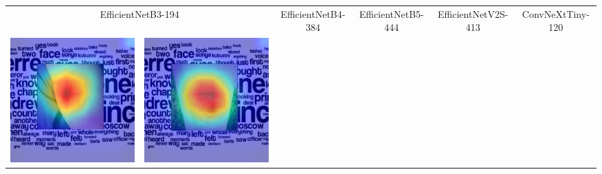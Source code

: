 \begin{landscape}
\begin{table}[]
\begin{tabular}{@{}c c c c c c c c c c@{}}
			\multicolumn{2}{c}{EfficientNetB3-194} & \multicolumn{2}{c}{EfficientNetB4-384} & \multicolumn{2}{c}{EfficientNetB5-444} & \multicolumn{2}{c}{EfficientNetV2S-413} & \multicolumn{2}{c}{ConvNeXtTiny-120}\\
			\includegraphics[width=.12\textheight ,keepaspectratio]{images/pretraining/gradcam/3/EfficientNetB3CombinedGradCam.png} &
			\includegraphics[width=.12\textheight ,keepaspectratio]{images/pretraining/gradcam/9/EfficientNetB3CombinedGradCam.png} &

\end{tabular}
\end{table}
\end{landscape}
